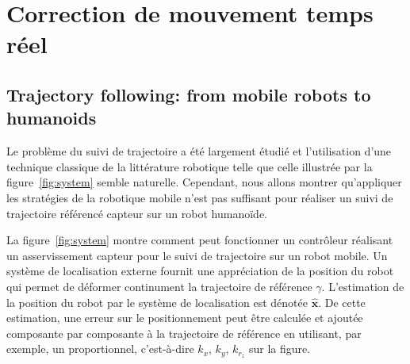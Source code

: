 \section{Correction de mouvement temps réel}
\subsection{Trajectory following: from mobile robots to humanoids}


Le problème du suivi de trajectoire a été largement étudié et
l'utilisation d'une technique classique de la littérature robotique
telle que celle illustrée par la figure \ref{fig:system} semble
naturelle. Cependant, nous allons montrer qu'appliquer les stratégies de
la robotique mobile n'est pas suffisant pour réaliser un suivi de
trajectoire référencé capteur sur un robot humanoïde.


La figure \ref{fig:system} montre comment peut fonctionner un
contrôleur réalisant un asservissement capteur pour le suivi de
trajectoire sur un robot mobile. Un système de localisation externe
fournit une appréciation de la position du robot qui permet de
déformer continument la trajectoire de référence
$\gamma$. L'estimation de la position du robot par le système de
localisation est dénotée $\hat{\mathbf{x}}$. De cette estimation, une
erreur sur le positionnement peut être calculée et ajoutée composante
par composante à la trajectoire de référence en utilisant, par
exemple, un proportionnel, c'est-à-dire $k_x$, $k_y$, $k_{r_z}$ sur la
figure.


